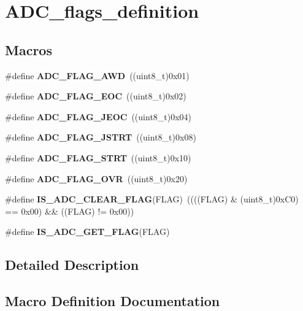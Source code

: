 \section{A\+D\+C\+\_\+flags\+\_\+definition}
\label{group__ADC__flags__definition}
\subsection*{Macros}
\begin{DoxyCompactItemize}
\item 
\#define \textbf{ A\+D\+C\+\_\+\+F\+L\+A\+G\+\_\+\+A\+WD}~((uint8\+\_\+t)0x01)
\item 
\#define \textbf{ A\+D\+C\+\_\+\+F\+L\+A\+G\+\_\+\+E\+OC}~((uint8\+\_\+t)0x02)
\item 
\#define \textbf{ A\+D\+C\+\_\+\+F\+L\+A\+G\+\_\+\+J\+E\+OC}~((uint8\+\_\+t)0x04)
\item 
\#define \textbf{ A\+D\+C\+\_\+\+F\+L\+A\+G\+\_\+\+J\+S\+T\+RT}~((uint8\+\_\+t)0x08)
\item 
\#define \textbf{ A\+D\+C\+\_\+\+F\+L\+A\+G\+\_\+\+S\+T\+RT}~((uint8\+\_\+t)0x10)
\item 
\#define \textbf{ A\+D\+C\+\_\+\+F\+L\+A\+G\+\_\+\+O\+VR}~((uint8\+\_\+t)0x20)
\item 
\#define \textbf{ I\+S\+\_\+\+A\+D\+C\+\_\+\+C\+L\+E\+A\+R\+\_\+\+F\+L\+AG}(F\+L\+AG)~((((F\+L\+AG) \& (uint8\+\_\+t)0x\+C0) == 0x00) \&\& ((\+F\+L\+A\+G) != 0x00))
\item 
\#define \textbf{ I\+S\+\_\+\+A\+D\+C\+\_\+\+G\+E\+T\+\_\+\+F\+L\+AG}(F\+L\+AG)
\end{DoxyCompactItemize}


\subsection{Detailed Description}


\subsection{Macro Definition Documentation}
\mbox{\label{group__ADC__flags__definition_gadb75a4b430fb84950232b7a8f3a6a877}} 
